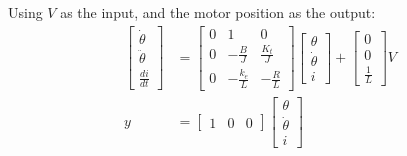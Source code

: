 \documentclass[11pt]{article}
\begin{document}
Using $V$ as the input, and the motor position as the output:
\begin{subequations}
  \begin{align}
    \begin{bmatrix}
      \dot{\theta} \\
      \ddot{\theta} \\
      \frac{di}{dt}
    \end{bmatrix}
    &=
    \begin{bmatrix}
      0 & 1 & 0 \\
      0 & -\frac{B}{J} & \frac{K_t}{J} \\
      0 & -\frac{k_e}{L} & -\frac{R}{L}
    \end{bmatrix}
    \begin{bmatrix}
      \theta \\
      \dot{\theta} \\
      i
    \end{bmatrix}
    +
    \begin{bmatrix}
      0 \\
      0 \\
      \frac{1}{L}
    \end{bmatrix}
    V \\
    y &=
    \begin{bmatrix}
      1 & 0 & 0
    \end{bmatrix}
    \begin{bmatrix}
      \theta \\
      \dot{\theta} \\
      i
    \end{bmatrix}
  \end{align}
\end{subequations}
\end{document}
